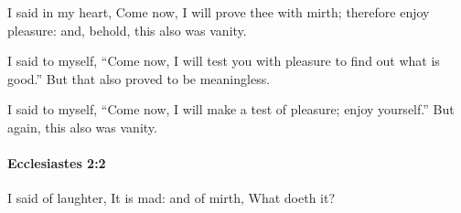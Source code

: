 			\begin{versebox}
					\item[BHS] 
					\item[LXX] 
					\item[ASV] I said in my heart, Come now, I will prove thee with mirth; therefore enjoy pleasure: and, behold, this also was vanity.
					\item[NIV] I said to myself, “Come now, I will test you with pleasure to find out what is good.” But that also proved to be meaningless.
					\item[NRSV] I said to myself, “Come now, I will make a test of pleasure; enjoy yourself.” But again, this also was vanity.
			\end{versebox}

		\paragraph{Ecclesiastes 2:2} %
			\label{ECCLESIASTES-2-2}

			I said of laughter, It is mad: and of mirth, What doeth it?

